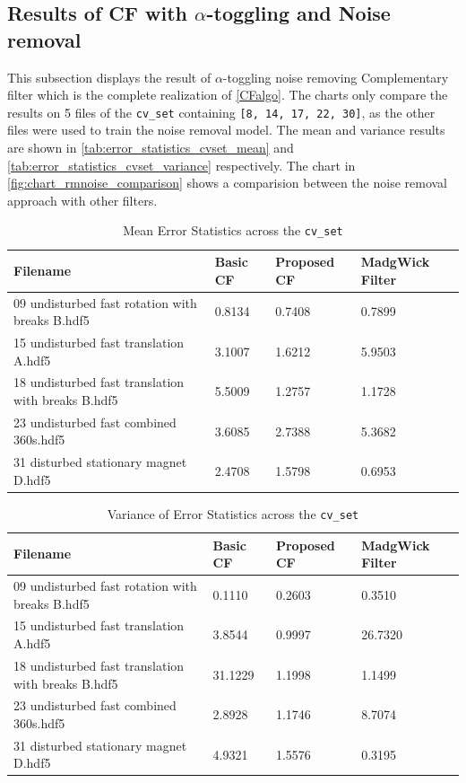 \documentclass{iutbscthesis}
\begin{document}
\subsection{Results of CF with $\alpha$-toggling and Noise removal}
This subsection displays the result of $\alpha$-toggling noise removing Complementary filter which is the complete realization of \autoref{CFalgo}. The charts only compare the results on 5 files of the \texttt{cv\_set} containing \texttt{[8, 14, 17, 22, 30]}, as the other files were used to train the noise removal model. The mean and variance results are shown in \autoref{tab:error_statistics_cvset_mean} and \autoref{tab:error_statistics_cvset_variance} respectively. The chart in \autoref{fig:chart_rmnoise_comparison} shows a comparision between the noise removal approach with other filters.

\begin{table}[H]
\centering
\caption{Mean Error Statistics across the \texttt{cv\_set}}
\label{tab:error_statistics_cvset_mean}
    \begin{tabular}{|p{}|p{}|p{}|p{}|}
    \hline
    \textbf{Filename} & \textbf{Basic CF} & \textbf{Proposed CF} & \textbf{ MadgWick Filter} \\
    \hline
    09 undisturbed fast rotation with breaks B.hdf5 & 0.8134 & 0.7408 & 0.7899 \\
    \hline
    15 undisturbed fast translation A.hdf5 & 3.1007 & 1.6212 & 5.9503 \\
    \hline
    18 undisturbed fast translation with breaks B.hdf5 & 5.5009 & 1.2757 & 1.1728 \\
    \hline
    23 undisturbed fast combined 360s.hdf5 & 3.6085 & 2.7388 & 5.3682 \\
    \hline
    31 disturbed stationary magnet D.hdf5 & 2.4708 & 1.5798 & 0.6953 \\
    \hline
    \end{tabular}
\end{table}

\begin{table}[H]
\centering
\caption{Variance of Error Statistics across the \texttt{cv\_set}}
\label{tab:error_statistics_cvset_variance}
    \begin{tabular}{|p{}|p{}|p{}|p{}|}
    \hline
    \textbf{Filename} & \textbf{Basic CF} & \textbf{Proposed CF} & \textbf{MadgWick Filter} \\
    \hline
    09 undisturbed fast rotation with breaks B.hdf5 & 0.1110 & 0.2603 & 0.3510 \\
    \hline
    15 undisturbed fast translation A.hdf5 & 3.8544 & 0.9997 & 26.7320 \\
    \hline
    18 undisturbed fast translation with breaks B.hdf5 & 31.1229 & 1.1998 & 1.1499 \\
    \hline
    23 undisturbed fast combined 360s.hdf5 & 2.8928 & 1.1746 & 8.7074 \\
    \hline
    31 disturbed stationary magnet D.hdf5 & 4.9321 & 1.5576 & 0.3195 \\
    \hline
    \end{tabular}
\end{table}
\end{document}
